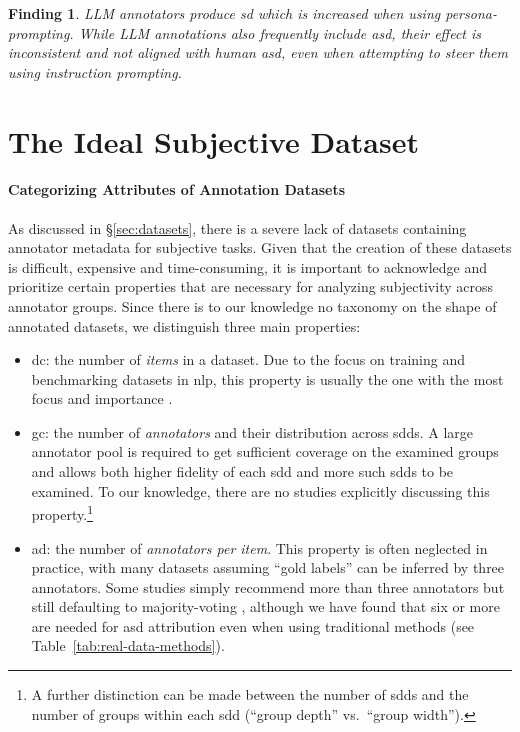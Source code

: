 \documentclass[manuscript,screen,review,anonymous]{acmart}
\theoremstyle{acmplain}
\newtheorem{finding}{Finding}
\theoremstyle{researchquestionstyle}
\begin{document}
\begin{finding}
	\label{finding:llms}
	LLM annotators produce \ac{sd} which is increased when using persona-prompting. While LLM annotations also frequently include \ac{asd}, their effect is inconsistent and not aligned with human \ac{asd}, even when attempting to steer them using instruction prompting.
\end{finding}


\section{The Ideal Subjective Dataset}
\label{sec:discussion}

\paragraph{Categorizing Attributes of Annotation Datasets} As discussed in \S\ref{sec:datasets}, there is a severe lack of datasets containing annotator metadata for subjective tasks. Given that the creation of these datasets is difficult, expensive and time-consuming, it is important to acknowledge and prioritize certain properties that are necessary for analyzing subjectivity across annotator groups. Since there is to our knowledge no taxonomy on the shape of annotated datasets, we distinguish three main properties:
\begin{itemize}
	\item \ac{dc}: the number of \emph{items} in a dataset. Due to the focus on training and benchmarking datasets in \ac{nlp}, this property is usually the one with the most focus and importance \citep{rossi_2024}.
	
	\item \ac{gc}: the number of \emph{annotators} and their distribution across \acp{sdd}. A large annotator pool is required to get sufficient coverage on the examined groups and allows both higher fidelity of each \ac{sdd} and more such \acp{sdd} to be examined. To our knowledge, there are no studies explicitly discussing this property.\footnote{A further distinction can be made between the number of \acp{sdd} and the number of groups within each \ac{sdd} (``group depth'' vs.\ ``group width'').}
	
	\item \ac{ad}: the number of \emph{annotators per item}. This property is often neglected in practice, with many datasets \citep{mulki-etal-2019-l, das2024investigatingannotatorbiaslarge, tonneau-etal-2024-languages, kumar2021tweetblmhatespeechdataset, tonneau-etal-2025-hateday} assuming ``gold labels'' can be inferred by three annotators. Some studies simply recommend more than three annotators but still defaulting to majority-voting \citep{Beck2023}, although we have found that six or more are needed for \ac{asd} attribution even when using traditional methods (see Table~\ref{tab:real-data-methods}).
\end{itemize}
\end{document}
